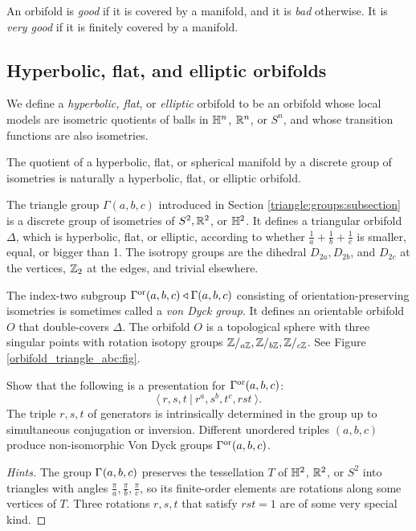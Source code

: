 \begin{defn}
An orbifold is \emph{good} if it is covered by a manifold, and it is \emph{bad} otherwise. It is \emph{very good} if it is finitely covered by a manifold. 
\end{defn}

\subsection{Hyperbolic, flat, and elliptic orbifolds} \label{more:examples:subsection}
We define a \emph{hyperbolic, flat}, or \emph{elliptic} orbifold to be an orbifold whose local models are isometric quotients of balls in $\mathbb{H}^n$, $\mathbb{R}^n$, or $S^n$, and whose transition functions are also isometries. 

The quotient of a hyperbolic, flat, or spherical manifold by a discrete group of isometries is naturally a hyperbolic, flat, or elliptic orbifold.

\begin{example}
The triangle group $\Gamma(a,b,c)$ introduced in Section \ref{triangle:groups:subsection} is a discrete group of isometries of $S^2, \mathbb{R}^2$, or $\mathbb{H}^2$. It defines a triangular orbifold $\Delta$, which is hyperbolic, flat, or elliptic, according to whether $\frac 1a+\frac 1b + \frac 1c$ is smaller, equal, or bigger than 1. The isotropy groups are the dihedral $D_{2a}, D_{2b}$, and $D_{2c}$ at the vertices, $\mathbb{Z}_2$ at the edges, and trivial elsewhere.

The index-two subgroup $\Gamma^{\rm or}(a,b,c) \triangleleft \Gamma(a,b,c)$ consisting of orientation-preserving isometries is sometimes called a \emph{von Dyck group}. It defines an orientable orbifold $O$ that double-covers $\Delta$. The orbifold $O$ is a topological sphere with three singular points with rotation isotopy groups $\mathbb{Z}/_{a\mathbb{Z}}, \mathbb{Z}/_{b\mathbb{Z}}, \mathbb{Z}/_{c\mathbb{Z}}$. See Figure \ref{orbifold_triangle_abc:fig}.
\end{example}

\begin{ex} \label{VD:ex}
Show that the following is a presentation for $\Gamma^{\rm or}(a,b,c)$:
$$\langle\ r, s, t\ |\ r^{a}, s^{b}, t^{c}, rst\ \rangle.$$
The triple $r,s,t$ of generators is intrinsically determined in the group up to simultaneous conjugation or inversion. Different unordered triples $(a,b,c)$ produce non-isomorphic Von Dyck groups $\Gamma^{\rm or}(a,b,c)$.
\end{ex}
\begin{proof}[Hints]
The group $\Gamma^{\rm}(a,b,c)$ preserves the tessellation $T$ of $\mathbb{H}^2$, $\mathbb{R}^2$, or $S^2$ into triangles with angles $\frac \pi a, \frac \pi b, \frac \pi c$, so its finite-order elements are rotations along some vertices of $T$. Three rotations $r,s,t$ that satisfy $rst=1$ are of some very special kind.
\end{proof}

